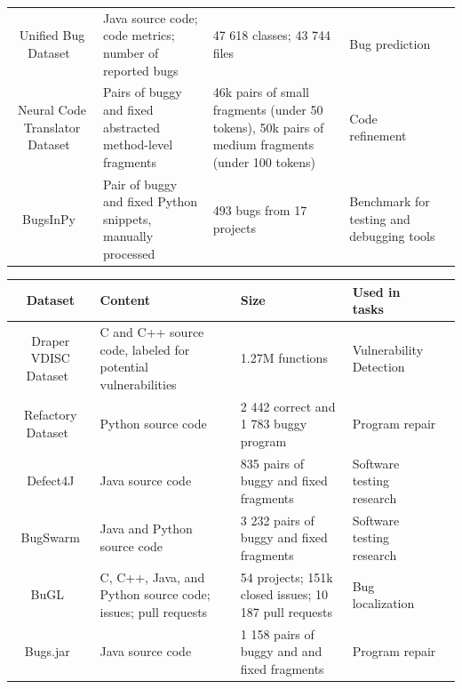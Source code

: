 \documentclass[mathematics,review,submit,moreauthors,pdftex]{Definitions/mdpi}
\begin{document}
\begin{specialtable}[H]
\begin{tabulary}{.7\textwidth}{CLLLl}
Unified Bug Dataset~\cite{ferenc2020public} & Java source code; code metrics; number of reported bugs & 47 618 classes; 43 744 files & Bug prediction \\
Neural Code Translator Dataset~\cite{TufanoEtAl2018} & Pairs of buggy and fixed abstracted method-level fragments & 46k pairs of small fragments (under 50 tokens), 50k pairs of medium fragments (under 100 tokens) & Code refinement \\
BugsInPy~\cite{WidyasariEtAl2020} & Pair of buggy and fixed Python snippets, manually processed & 493 bugs from 17 projects & Benchmark for testing and debugging tools \\
\bottomrule
\end{tabulary}
\end{specialtable}


\begin{specialtable}[H] 
\renewcommand{\arraystretch}{2.0}
\begin{tabulary}{.7\textwidth}{CLLLl}
\toprule
\textbf{Dataset}	& \textbf{Content}	& \textbf{Size}  & \parbox{10em}{\textbf{Used in tasks}}\\
\midrule
Draper VDISC Dataset~\cite{RusselEtAl2018} & C and C++ source code, labeled for potential vulnerabilities & 1.27M functions & Vulnerability Detection \\
Refactory Dataset~\cite{yang2019refactory} & Python source code & 2 442 correct and 1 783 buggy program & Program repair \\
\hbox{Defect4J}\cite{just2014defects4j} & Java source code & 835 pairs of buggy and fixed fragments & Software testing research \\
BugSwarm\cite{Tomassi2019bugswarm} & Java and Python source code & 3 232 pairs of buggy and fixed fragments & Software testing research \\
BuGL~\cite{muvva2020bugl} & C, C++, Java, and Python source code; issues; pull requests & 54 projects; 151k closed issues; 10 187 pull requests & Bug localization \\
Bugs.jar~\cite{SahaEtAl2018bugsjar} & Java source code & 1 158 pairs of buggy and and fixed fragments & Program repair \\
\bottomrule
\end{tabulary}
\end{specialtable}
\end{document}
